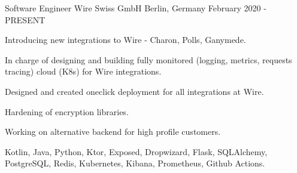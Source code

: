 
\begin{cventries}


	\cventry
	{Software Engineer}
	{Wire Swiss GmbH}
	{Berlin, Germany}
	{February 2020 - PRESENT}
	{
		\begin{cvitems}
			\setlength\itemsep{8pt}
			\item {Introducing new integrations to Wire - Charon, Polls, Ganymede.}
			\item {In charge of designing and building fully monitored (logging, metrics, requests tracing) cloud (K8s) for Wire integrations.}
			\item {Designed and created oneclick deployment for all integrations at Wire.}
			\item {Hardening of encryption libraries.}
			\item {Working on alternative backend for high profile customers.}
			\item {Kotlin, Java, Python, Ktor, Exposed, Dropwizard, Flask, SQLAlchemy, PostgreSQL, Redis, Kubernetes, Kibana, Prometheus, Github Actions.}
		\end{cvitems}
	}


\end{cventries}
